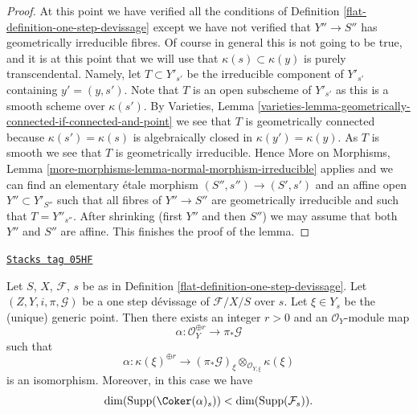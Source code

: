 \begin{proof}
\medskip\noindent
At this point we have verified all the conditions of
Definition \ref{flat-definition-one-step-devissage}
except we have not verified that $Y'' \to S''$ has geometrically
irreducible fibres. Of course in general this is not going to be
true, and it is at this point that we will use that
$\kappa(s) \subset \kappa(y)$ is purely transcendental. Namely,
let $T \subset Y'_{s'}$ be the irreducible component of
$Y'_{s'}$ containing $y' = (y, s')$. Note that $T$ is an open subscheme
of $Y'_{s'}$ as this is a smooth scheme over $\kappa(s')$. By
Varieties,
Lemma \ref{varieties-lemma-geometrically-connected-if-connected-and-point}
we see that $T$ is geometrically connected because $\kappa(s') = \kappa(s)$
is algebraically closed in $\kappa(y') = \kappa(y)$.
As $T$ is smooth we see that $T$ is geometrically irreducible. Hence
More on Morphisms,
Lemma \ref{more-morphisms-lemma-normal-morphism-irreducible}
applies and we can find an elementary \'etale morphism
$(S'', s'') \to (S', s')$ and an affine open $Y'' \subset Y'_{S''}$
such that all fibres of $Y'' \to S''$ are geometrically irreducible
and such that $T = Y''_{s''}$. After shrinking (first $Y''$ and then $S''$)
we may assume that both $Y''$ and $S''$ are affine.
This finishes the proof of the lemma.
\end{proof}

\begin{lemma}
\label{flat-lemma-existence-alpha}
\href{https://stacks.math.columbia.edu/tag/05HF}{\texttt{Stacks tag 05HF}}

Let $S$, $X$, $\mathcal{F}$, $s$ be as in
Definition \ref{flat-definition-one-step-devissage}.
Let $(Z, Y, i, \pi, \mathcal{G})$ be a one step d\'evissage
of $\mathcal{F}/X/S$ over $s$.
Let $\xi \in Y_s$ be the (unique) generic point.
Then there exists an integer $r > 0$ and an $\mathcal{O}_Y$-module map
$$
\alpha : \mathcal{O}_Y^{\oplus r} \longrightarrow \pi_*\mathcal{G}
$$
such that
$$
\alpha :
\kappa(\xi)^{\oplus r}
\longrightarrow
(\pi_*\mathcal{G})_\xi \otimes_{\mathcal{O}_{Y, \xi}} \kappa(\xi)
$$
is an isomorphism. Moreover, in this case we have
$$
\dim(\text{Supp}(\Coker(\alpha)_s)) < \dim(\text{Supp}(\mathcal{F}_s)).
$$
\end{lemma}

